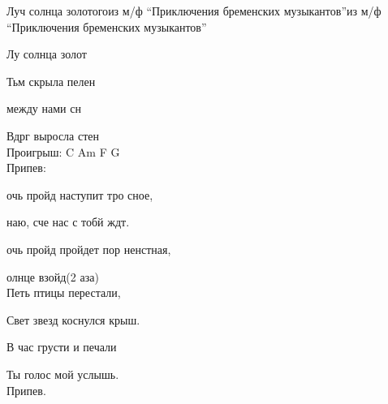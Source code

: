 \documentclass[11pt,a5paper]{book}
\renewcommand{\tt}{\indent \indent}
\begin{document}
\begin{song}{Луч солнца золотого}{}{из м/ф “Приключения бременских музыкантов”}{из м/ф “Приключения бременских музыкантов”}{}{}

Лу солнца золот\par
Тьм скрыла пелен\par
{} между нами сн\par
Вдрг выросла стен\\
 
Проигрыш: C Am F G\\
 
Припев:\par
\tt{}очь пройд наступит тро сное,\par
\tt{}наю, сче нас с тобй ждт.\par
\tt{}очь пройд пройдет пор ненстная,\par
\tt{}олнце взойд(2 аза)\\
 
Петь птицы перестали,\par
Свет звезд коснулся крыш.\par
В час грусти и печали\par
Ты голос мой услышь. \\

Припев.\\

\end{song} 
\end{document}
